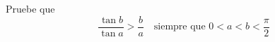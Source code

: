 \item Pruebe que
    $$\frac{\tan b}{\tan a} > \frac{b}{a} \quad \text{siempre que } 0 < a < b < \frac{\pi}{2}$$
